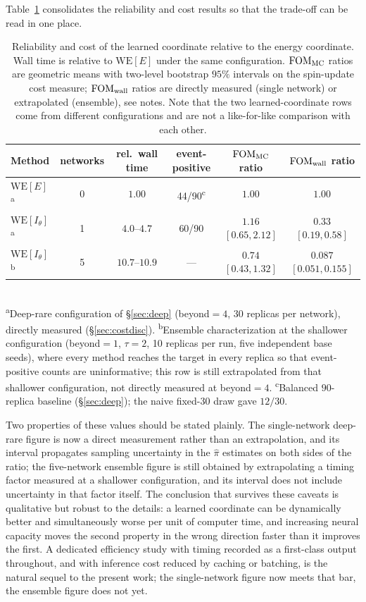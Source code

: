 \documentclass[a4paper,fleqn]{cas-sc}
\newcommand{\WE}{\mathrm{WE}}
\newcommand{\FOM}{\mathrm{FOM}}
\begin{document}
Table~\ref{tab:cost} consolidates the reliability and cost results so that the trade-off can be
read in one place.

\begin{table}[H]
\centering\small
\caption{Reliability and cost of the learned coordinate relative to the energy coordinate.
Wall time is relative to $\WE[E]$ under the same configuration. $\FOM_{\rm MC}$ ratios are
geometric means with two-level bootstrap $95\%$ intervals on the spin-update cost measure;
$\FOM_{\rm wall}$ ratios are directly measured (single network) or extrapolated (ensemble), see
notes. Note that the two learned-coordinate rows come from different configurations and are not
a like-for-like comparison with each other.}
\label{tab:cost}
\begin{tabular}{lccccc}
\toprule
Method & networks & rel.\ wall time & event-positive & $\FOM_{\rm MC}$ ratio &
$\FOM_{\rm wall}$ ratio \\
\midrule
$\WE[E]$\textsuperscript{a} & 0 & $1.00$ & 44/90\textsuperscript{c} & $1.00$ & $1.00$ \\
$\WE[I_\theta]$\textsuperscript{a} & 1 & $4.0$--$4.7$ & 60/90 &
$1.16$ $[0.65,2.12]$ & $0.33$ $[0.19,0.58]$ \\
$\WE[I_\theta]$\textsuperscript{b} & 5 & $10.7$--$10.9$ & --- &
$0.74$ $[0.43,1.32]$ & $0.087$ $[0.051,0.155]$ \\
\bottomrule
\end{tabular}
\\[2pt]
{\footnotesize\textsuperscript{a}Deep-rare configuration of \S\ref{sec:deep}
(beyond$=4$, 30 replicas per network), directly measured (\S\ref{sec:costdisc}).
\textsuperscript{b}Ensemble characterization at the shallower configuration
(beyond$=1$, $\tau=2$, 10 replicas per run, five independent base seeds), where every method
reaches the target in every replica so that event-positive counts are uninformative; this row
is still extrapolated from that shallower configuration, not directly measured at beyond$=4$.
\textsuperscript{c}Balanced $90$-replica baseline (\S\ref{sec:deep}); the naive fixed-30 draw
gave $12/30$.}
\end{table}

Two properties of these values should be stated plainly. The single-network deep-rare figure is
now a direct measurement rather than an extrapolation, and its interval propagates sampling
uncertainty in the $\hat\pi$ estimates on both sides of the ratio; the five-network ensemble
figure is still obtained by extrapolating a timing factor measured at a shallower configuration,
and its interval does not include uncertainty in that factor itself. The conclusion that survives
these caveats is qualitative but robust to the details: a learned coordinate can be dynamically
better and simultaneously worse per unit of computer time, and increasing neural capacity moves
the second property in the wrong direction faster than it improves the first. A dedicated
efficiency study with timing recorded as a first-class output throughout, and with inference cost
reduced by caching or batching, is the natural sequel to the present work; the single-network
figure now meets that bar, the ensemble figure does not yet.
\end{document}
